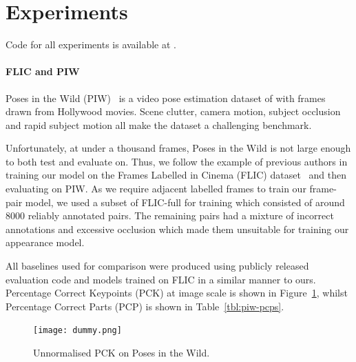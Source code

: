 \documentclass[runningheads]{llncs}
\begin{document}
\section{Experiments}\label{sec:experiments}


Code for all experiments is available at .

\paragraph{FLIC and PIW} Poses in the Wild (PIW)~\cite{cherian2014mixing} is a
video pose estimation dataset of with frames drawn from Hollywood movies. Scene
clutter, camera motion, subject occlusion and rapid subject motion all make the
dataset a challenging benchmark.

Unfortunately, at under a thousand frames, Poses in the Wild is not large enough
to both test and evaluate on. Thus, we follow the example of previous authors in
training our model on the Frames Labelled in Cinema (FLIC)
dataset~\cite{sapp2013modec} and then evaluating on PIW\@. As we require
adjacent labelled frames to train our frame-pair model, we used a subset of
FLIC-full for training which consisted of around 8000 reliably annotated pairs.
The remaining pairs had a mixture of incorrect annotations and excessive
occlusion which made them unsuitable for training our appearance model.

All baselines used for comparison were produced using publicly released
evaluation code and models trained on FLIC in a similar manner to ours.
Percentage Correct Keypoints (PCK) at image scale is shown in
Figure~\ref{fig:piw-pcks}, whilst Percentage Correct Parts (PCP) is shown in
Table~\ref{tbl:piw-pcps}.


\begin{figure}[t]
\begin{center}
\texttt{[image: dummy.png]}
\end{center}
\caption{Unnormalised PCK on Poses in the Wild.}
\label{fig:piw-pcks}
\end{figure}
\end{document}
